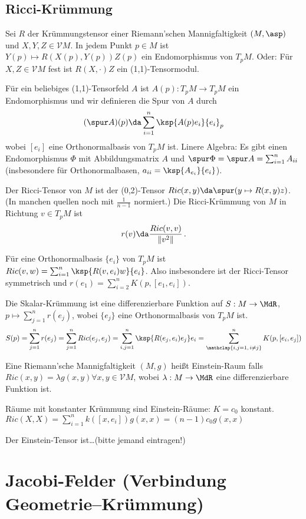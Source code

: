 \documentclass[a4paper,twoside,DIV15,BCOR12mm]{scrbook}
\newcommand{\V}{\mathcal V}
\begin{document}
\section{Ricci-Krümmung}

Sei $R$ der Krümmungstensor einer Riemann’schen Mannigfaltigkeit $(M,\asp)$ und $X,Y,Z \in \V M$. In jedem Punkt $p\in M$ ist $Y(p) \mapsto R(X(p),Y(p))Z(p)$ ein Endomorphismus von $T_pM$. Oder: Für $X,Z \in \V M$ fest ist $R(X,\cdot)Z$ ein (1,1)-Tensormodul.

Für ein beliebiges (1,1)-Tensorfeld $A$ ist $A(p):T_pM \to T_pM$ ein Endomorphismus und wir definieren die Spur von $A$ durch
\[
(\spur A)(p) \da \sum_{i=1}^n \ksp {A(p)e_i}{e_i}_p
\] wobei $[e_i]$ eine Orthonormalbasis von $T_pM$ ist. Linere Algebra: Es gibt einen Endomorphismus $\Phi$ mit Abbildungsmatrix $A$ und $\spur \Phi = \spur A = \sum_{i=1}^n A_{ii}$ (insbesondere für Orthonormalbasen, $a_{ii} = \ksp {A_{e_i}}{e_i}$).

Der Ricci-Tensor von $M$ ist der (0,2)-Tensor $Ric(x,y)\da \spur(y\mapsto R(x,y)z)$. (In manchen quellen noch mit $\frac1{n-1}$ normiert.) Die Ricci-Krümmung von $M$ in Richtung $v\in T_pM$ ist \[r(v) \da \frac{Ric(v,v)}{\|v^2\|}\,.\]

Für eine Orthonormalbasis $\{e_i\}$ von $T_pM$ ist $Ric(v,w) = \sum_{i=1}^n \ksp {R(v,e_i)w} {e_i}$. Also insbesondere ist der Ricci-Tensor symmetrisch und $r(e_1) = \sum_{i=2}^n K(p,[e_1,e_i])$.

Die Skalar-Krümmung ist eine differenzierbare Funktion auf $S:M\to \MdR$, $p\mapsto \sum_{j=1}^n r(e_j)$, wobei $\{e_j\}$ eine Orthonormalbasis von $T_pM$ ist.
\[
S(p) = \sum_{j=1}^n r(e_j) = \sum_{j=1}^n Ric(e_j, e_j) = \sum_{i,j=1}^n \ksp {R(e_j, e_i)e_j} e_i =\sum_{\mathclap{i,j=1,\,i\ne j}}^n K(p, [e_i, e_j])
\]

Eine Riemann’sche Mannigfaltigkeit $(M,g)$ heißt Einstein-Raum falls $Ric(x,y) = \lambda g(x,y) \forall x,y\in \V M$, wobei $\lambda:M \to \MdR$ eine differenzierbare Funktion ist.

\begin{beispiel}
Räume mit konstanter Krümmung sind Einstein-Räume: $K=c_0$ konstant. $Ric(X,X)=\sum_{i=1}^n k([x,e_i]) g(x,x) = (n-1) c_0 g(x,x)$
\end{beispiel}

\begin{bemerkung}
Der Einstein-Tensor ist\dots (bitte jemand eintragen!)
\end{bemerkung}

\chapter{Jacobi-Felder (Verbindung Geometrie--Krümmung)}
\end{document}
